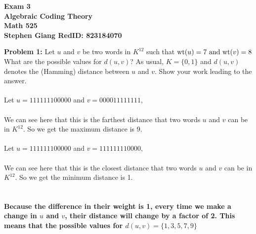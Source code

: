\documentclass[11pt]{article}
\newcommand{\skipline}{\vspace{\baselineskip}}
\newenvironment{problem}[1]{\textbf{Problem #1: }}{\newpage}
\begin{document}
	
	\begin{center}
		\textbf{Exam 3} \\
		\textbf{Algebraic Coding Theory} \\
		\textbf{Math 525} \\
		\textbf{Stephen Giang RedID: 823184070} \\
		\skipline \skipline
	\end{center}

	\begin{problem}{1}
		Let $u$ and $v$ be two words in $K^{12}$ such that ${\rm wt}(u) = 7 \mbox{ and } {\rm wt}(v) = 8$ What are the possible values for $d(u,v)$? As usual, $K = \{0,1\}$ and $d(u,v)$ denotes the (Hamming) distance between $u$ and $v$. Show your work leading to the answer.
		\\ \\
		Let $u = 111111100000$ and $v = 000011111111$, 
		\\ \\
		We can see here that this is the farthest distance that two words $u$ and $v$ can be in $K^{12}$.  So we get the maximum distance is 9.
		\\ \\
		Let $u = 111111100000$ and $v = 111111110000$,
		\\ \\
		We can see here that this is the closest distance that two words $u$ and $v$ can be in $K^{12}$.  So we get the minimum distance is 1.
		\\ \\ \\
		\textbf{\boldmath Because the difference in their weight is 1, every time we make a change in $u$ and $v$, their distance will change by a factor of 2.  This means that the possible values for $d(u,v) = \{1,3,5,7,9\}$}
	\end{problem}
\end{document}
